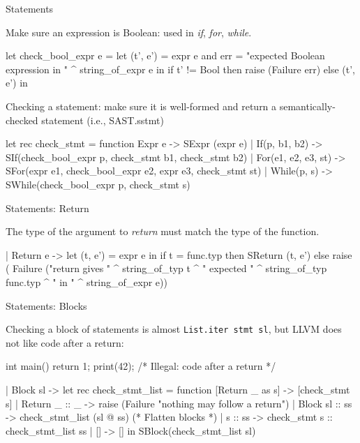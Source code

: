 \documentclass{plt}
\begin{document}
\begin{frame}[fragile=singleslide]{Statements}

Make sure an expression is Boolean: used in \emph{if}, \emph{for}, \emph{while}.

\begin{ocaml}
let check_bool_expr e = 
  let (t', e') = expr e
  and err = "expected Boolean expression in " ^ string_of_expr e
  in if t' != Bool then raise (Failure err) else (t', e') 
in
\end{ocaml}

Checking a statement: make sure it is well-formed and return a
semantically-checked statement (i.e., SAST.sstmt)

\begin{ocaml}
let rec check_stmt = function
    Expr e -> SExpr (expr e)
  | If(p, b1, b2) ->
      SIf(check_bool_expr p, check_stmt b1, check_stmt b2)
  | For(e1, e2, e3, st) ->
      SFor(expr e1, check_bool_expr e2, expr e3, check_stmt st)
  | While(p, s) -> SWhile(check_bool_expr p, check_stmt s)
\end{ocaml}

\end{frame}

\begin{frame}[fragile=singleslide]{Statements: Return}

The type of the argument to \emph{return} must match the type of the function.

\begin{ocaml}
      | Return e -> let (t, e') = expr e in
        if t = func.typ then SReturn (t, e') 
        else raise (
	  Failure ("return gives " ^ string_of_typ t ^ " expected " ^
		   string_of_typ func.typ ^ " in " ^ string_of_expr e))	    
\end{ocaml}

\end{frame}

\begin{frame}[fragile=singleslide]{Statements: Blocks}

Checking a block of statements is almost \verb|List.iter stmt sl|, but
LLVM does not like code after a return:

\begin{C}
int main() {
   return 1;
   print(42); /* Illegal: code after a return */
}
\end{C}

\begin{ocaml}
      | Block sl -> 
          let rec check_stmt_list = function
              [Return _ as s] -> [check_stmt s]
            | Return _ :: _   -> raise (Failure "nothing may follow a return")
            | Block sl :: ss  -> check_stmt_list (sl @ ss) (* Flatten blocks *)
            | s :: ss         -> check_stmt s :: check_stmt_list ss
            | []              -> []
          in SBlock(check_stmt_list sl)
\end{ocaml}

\end{frame}
\end{document}
